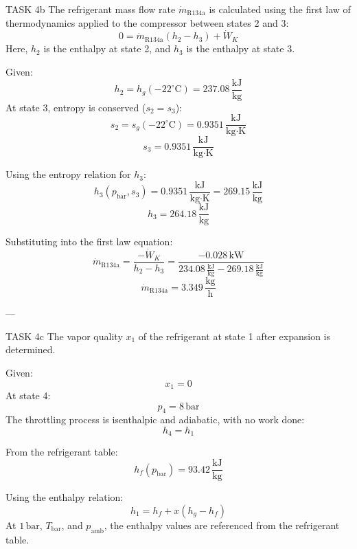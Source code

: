 TASK 4b  
The refrigerant mass flow rate \( \dot{m}_{\text{R134a}} \) is calculated using the first law of thermodynamics applied to the compressor between states 2 and 3:  
\[
0 = \dot{m}_{\text{R134a}} (h_2 - h_3) + \dot{W}_K
\]  
Here, \( h_2 \) is the enthalpy at state 2, and \( h_3 \) is the enthalpy at state 3.  

Given:  
\[
h_2 = h_g(-22^\circ\text{C}) = 237.08 \, \frac{\text{kJ}}{\text{kg}}
\]  
At state 3, entropy is conserved (\( s_2 = s_3 \)):  
\[
s_2 = s_g(-22^\circ\text{C}) = 0.9351 \, \frac{\text{kJ}}{\text{kg·K}}
\]  
\[
s_3 = 0.9351 \, \frac{\text{kJ}}{\text{kg·K}}
\]  

Using the entropy relation for \( h_3 \):  
\[
h_3(p_{\text{bar}}, s_3) = 0.9351 \, \frac{\text{kJ}}{\text{kg·K}} = 269.15 \, \frac{\text{kJ}}{\text{kg}}
\]  
\[
h_3 = 264.18 \, \frac{\text{kJ}}{\text{kg}}
\]  

Substituting into the first law equation:  
\[
\dot{m}_{\text{R134a}} = \frac{-\dot{W}_K}{h_2 - h_3} = \frac{-0.028 \, \text{kW}}{234.08 \, \frac{\text{kJ}}{\text{kg}} - 269.18 \, \frac{\text{kJ}}{\text{kg}}}
\]  
\[
\dot{m}_{\text{R134a}} = 3.349 \, \frac{\text{kg}}{\text{h}}
\]  

---

TASK 4c  
The vapor quality \( x_1 \) of the refrigerant at state 1 after expansion is determined.  

Given:  
\[
x_1 = 0
\]  
At state 4:  
\[
p_4 = 8 \, \text{bar}
\]  
The throttling process is isenthalpic and adiabatic, with no work done:  
\[
h_4 = h_1
\]  

From the refrigerant table:  
\[
h_f(p_{\text{bar}}) = 93.42 \, \frac{\text{kJ}}{\text{kg}}
\]  

Using the enthalpy relation:  
\[
h_1 = h_f + x(h_g - h_f)
\]  
At \( 1 \, \text{bar} \), \( T_{\text{bar}} \), and \( p_{\text{amb}} \), the enthalpy values are referenced from the refrigerant table.  

